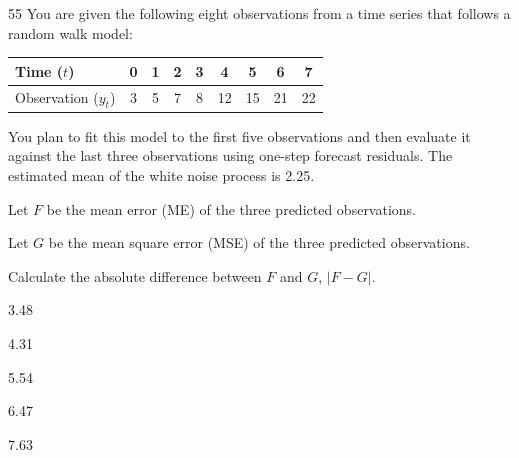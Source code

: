 \begin{question}{55}
You are given the following eight observations from a time series that follows a random walk model:
\begin{center}
\begin{tabular}{|l|c|c|c|c|c|c|c|c|}
\hline
Time ($t$) & 0 & 1 & 2 & 3 & 4 & 5 & 6 & 7 \\ \hline
Observation ($y_t$) & 3 & 5 & 7 & 8 & 12 & 15 & 21 & 22 \\ \hline
\end{tabular}
\end{center}

You plan to fit this model to the first five observations and then evaluate it against the last three observations using one-step forecast residuals. The estimated mean of the white noise process is 2.25.

Let $F$ be the mean error (ME) of the three predicted observations.

Let $G$ be the mean square error (MSE) of the three predicted observations.

Calculate the absolute difference between $F$ and $G$, $|F - G|$.

\begin{choices}
\item 3.48
\item 4.31
\item 5.54
\item 6.47
\item 7.63
\end{choices}
\end{question}

